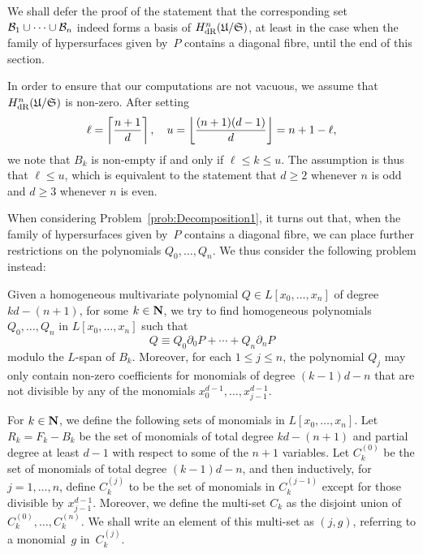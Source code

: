 We shall defer the proof of the statement that the corresponding 
set $\mathcal{B}_1 \cup \dotsb \cup \mathcal{B}_n$ indeed forms a basis of 
$H_{\text{dR}}^n(\mathfrak{U}/\mathfrak{S})$, at least in the case when 
the family of hypersurfaces given by~$P$ contains a diagonal fibre, 
until the end of this section.

\begin{rem}
In order to ensure that our computations are not vacuous, we assume that 
$H_{\text{dR}}^n(\mathfrak{U}/\mathfrak{S})$ is non-zero.  After setting 
\begin{equation*}
\ell = \left\lceil\frac{n+1}{d}\right\rceil, \quad u = \left\lfloor\frac{(n+1)(d-1)}{d}\right\rfloor = n+1 - \ell,
\end{equation*}
we note that $B_k$ is non-empty if and only if $\ell \leq k \leq u$.  The 
assumption is thus that $\ell \leq u$, which is equivalent to the statement 
that $d \geq 2$ whenever $n$ is odd and $d \geq 3$ whenever $n$ is even.
\end{rem}

When considering Problem~\ref{prob:Decomposition1}, it turns out that, 
when the family of hypersurfaces given by~$P$ contains a diagonal fibre, 
we can place further restrictions on the polynomials $Q_0, \dotsc, Q_n$.  We 
thus consider the following problem instead:

\begin{prob} \label{prob:Decomposition2}
Given a homogeneous multivariate polynomial $Q \in L[x_0, \dotsc, x_n]$ 
of degree \mbox{$k d - (n + 1)$}, for some $k \in \mathbf{N}$, we try to find 
homogeneous polynomials $Q_0, \dotsc, Q_n$ in $L[x_0, \dotsc, x_n]$ such 
that 
\begin{equation} \label{eq:PDecomposition2}
Q \equiv Q_0 \partial_0 P + \dotsb + Q_n \partial_n P
\end{equation}
modulo the $L$-span of $B_k$.  Moreover, for each $1 \leq j \leq n$,  the 
polynomial $Q_j$ may only contain non-zero coefficients for monomials of 
degree $(k-1)d-n$ that are not divisible by any of the monomials 
$x_0^{d-1}, \dotsc, x_{j-1}^{d-1}$.
\end{prob}

\begin{defn} \label{defn:IndexSets}
For $k \in \mathbf{N}$, we define the following sets of monomials in 
$L[x_0, \dotsc, x_n]$.  Let $R_k = F_k - B_k$ be the set of monomials of 
total degree $kd-(n+1)$ and partial degree at least $d-1$ with respect to some 
of the $n+1$ variables.  Let $C_k^{(0)}$ be the set of monomials of total 
degree $(k-1)d - n$, and then inductively, for $j = 1, \dotsc, n$, define 
$C_k^{(j)}$ to be the set of monomials in $C_k^{(j-1)}$ except for those 
divisible by $x_{j-1}^{d-1}$.  Moreover, we define the multi-set $C_k$ as 
the disjoint union of $C_k^{(0)}, \dotsc, C_k^{(n)}$.  We shall write an 
element of this multi-set as $(j, g)$, referring to a monomial~$g$ 
in~$C_k^{(j)}$.
\end{defn}

